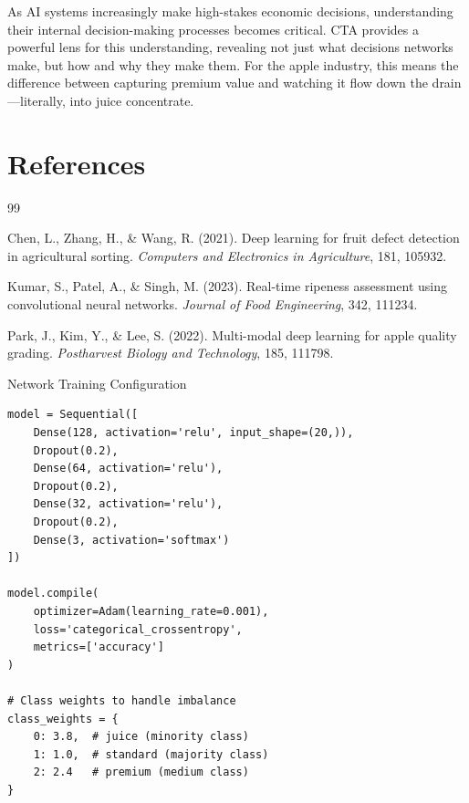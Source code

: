 \documentclass[11pt,a4paper]{article}
\begin{document}
As AI systems increasingly make high-stakes economic decisions, understanding their internal decision-making processes becomes critical. CTA provides a powerful lens for this understanding, revealing not just what decisions networks make, but how and why they make them. For the apple industry, this means the difference between capturing premium value and watching it flow down the drain—literally, into juice concentrate.

\section*{References}

\begingroup
\renewcommand{\section}[2]{}
\begin{thebibliography}{99}

Chen, L., Zhang, H., \& Wang, R. (2021). Deep learning for fruit defect detection in agricultural sorting. \textit{Computers and Electronics in Agriculture}, 181, 105932.

Kumar, S., Patel, A., \& Singh, M. (2023). Real-time ripeness assessment using convolutional neural networks. \textit{Journal of Food Engineering}, 342, 111234.

Park, J., Kim, Y., \& Lee, S. (2022). Multi-modal deep learning for apple quality grading. \textit{Postharvest Biology and Technology}, 185, 111798.

\end{thebibliography}
\endgroup

\appendix

\section{Implementation Details}

\subsection{Network Training Configuration}

\begin{lstlisting}
model = Sequential([
    Dense(128, activation='relu', input_shape=(20,)),
    Dropout(0.2),
    Dense(64, activation='relu'),
    Dropout(0.2),
    Dense(32, activation='relu'),
    Dropout(0.2),
    Dense(3, activation='softmax')
])

model.compile(
    optimizer=Adam(learning_rate=0.001),
    loss='categorical_crossentropy',
    metrics=['accuracy']
)

# Class weights to handle imbalance
class_weights = {
    0: 3.8,  # juice (minority class)
    1: 1.0,  # standard (majority class)  
    2: 2.4   # premium (medium class)
}
\end{lstlisting}
\end{document}

